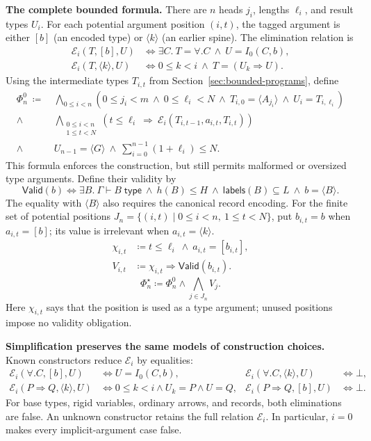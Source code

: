\documentclass[10pt,a4paper]{article}
\newcommand{\wf}[1]{\Gamma\vdash #1\;\mathsf{type}}
\newcommand{\iarg}[1]{\langle#1\rangle}
\begin{document}
\textbf{The complete bounded formula.}
There are $n$ heads $j_i$, lengths $\ell_i$, and result types $U_i$.
For each potential argument position $(i,t)$, the tagged argument is either
$[b]$ (an encoded type) or $\iarg{k}$ (an earlier spine).
The elimination relation is
\[
\begin{aligned}
 \mathcal E_i(T,[b],U)
   &\iff \exists C.\ T=\forall.C\ \land\ U=I_0(C,b),\\
 \mathcal E_i(T,\iarg{k},U)
   &\iff 0\le k<i\ \land\ T=(U_k\Rightarrow U).
\end{aligned}
\]
Using the intermediate types $T_{i,t}$ from Section~\ref{sec:bounded-programs}, define
\[
\begin{aligned}
 \Phi_n^0\ \coloneqq\
 &\bigwedge_{0\le i<n}
   \left(0\le j_i<m\ \land\ 0\le\ell_i<N\
      \land\ T_{i,0}=\langle A_{j_i}\rangle\
      \land\ U_i=T_{i,\ell_i}\right)\\
 {}\land{}&
 \bigwedge_{\substack{0\le i<n\\1\le t<N}}
   \left(t\le\ell_i\ \Longrightarrow\
     \mathcal E_i(T_{i,t-1},a_{i,t},T_{i,t})\right)\\
 {}\land{}&
 U_{n-1}=\langle G\rangle\
 \land\ \sum_{i=0}^{n-1}(1+\ell_i)\le N.
\end{aligned}
\]
This formula enforces the construction, but still permits malformed or oversized
type arguments. Define their validity by
\[
 \mathsf{Valid}(b)\iff
 \exists B.\ \wf B\ \land\ h(B)\le H\
 \land\ \mathsf{labels}(B)\subseteq L\ \land\ b=\langle B\rangle.
\]
The equality with $\langle B\rangle$ also requires the canonical record encoding.
For the finite set of potential positions
$J_n=\{(i,t)\mid0\le i<n,\ 1\le t<N\}$, put
$b_{i,t}=b$ when $a_{i,t}=[b]$; its value is irrelevant when $a_{i,t}=\iarg{k}$.
\[
\begin{aligned}
 \chi_{i,t}&\coloneqq t\le\ell_i\ \land\ a_{i,t}=[b_{i,t}],\\
 V_{i,t}&\coloneqq \chi_{i,t}\Longrightarrow\mathsf{Valid}(b_{i,t}).
\end{aligned}
\]
\[
 \boxed{\Phi_n^\star\coloneqq\Phi_n^0\land\bigwedge_{j\in J_n}V_j.}
\]
Here $\chi_{i,t}$ says that the position is used as a type argument; unused positions
impose no validity obligation.

\textbf{Simplification preserves the same models of construction choices.}
Known constructors reduce $\mathcal E_i$ by equalities:
\[
\begin{aligned}
 \mathcal E_i(\forall.C,[b],U)&\iff U=I_0(C,b),&
 \mathcal E_i(\forall.C,\iarg{k},U)&\iff\bot,\\
 \mathcal E_i(P\Rightarrow Q,\iarg{k},U)
   &\iff 0\le k<i\land U_k=P\land U=Q,&
 \mathcal E_i(P\Rightarrow Q,[b],U)&\iff\bot.
\end{aligned}
\]
For base types, rigid variables, ordinary arrows, and records, both eliminations
are false. An unknown constructor retains the full relation $\mathcal E_i$.
In particular, $i=0$ makes every implicit-argument case false.
\end{document}
